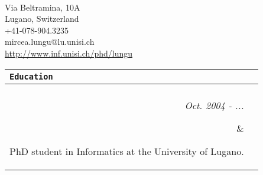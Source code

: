 \documentclass{article}
\newcommand{\cvsectionname}[1]{\multicolumn{2}{l}{\Large \tt #1}\\\hline\\}
\newenvironment{cvsection}[1]{\medskip \begin{tabular}{rl} \cvsectionname{#1}}{\end{tabular}}
\newcommand{\cvline}[2]{\parbox[t]{2.3cm}{\sl  \hfill #1} & \parbox[t]{14cm}{ #2 \hfill}\\\vspace{4pt}}
\newcommand{\cvexplanationline}[1]{ & $\triangleright$ #1 \hfill \\\vspace{4pt}}
\begin{document}
\pagestyle{empty}

\begin{center}
\hspace*{4.8cm}{\LARGE  \bf     Mircea Filip LUNGU}  \\[9pt]
\hspace*{4.8cm}Via Beltramina, 10A  \\
\hspace*{4.8cm}Lugano, Switzerland  \\
\hspace*{4.8cm}+41-078-904.3235  \\
\hspace*{4.8cm}mircea.lungu@lu.unisi.ch  \\
\hspace*{4.8cm}\href{http://www.inf.unisi.ch/phd/lungu}{http://www.inf.unisi.ch/phd/lungu}
\end{center}

\vspace{0.3cm}

\begin{cvsection}{Education}
\cvline{Oct. 2004 - ...} {PhD student in Informatics at the University of Lugano. 
}

\cvline{1999 - 2004} {Student at the Faculty of Informatics from ``Politehnica'' University of Timi\c{s}oara}

\end{cvsection}
\end{document}
